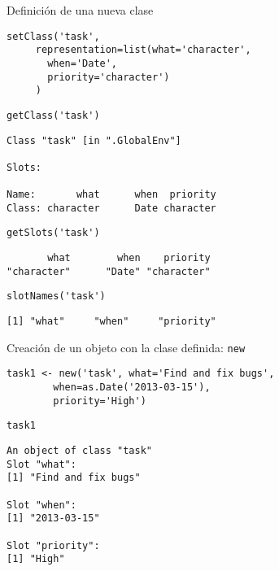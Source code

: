 \documentclass[xcolor={usenames,svgnames,dvipsnames}]{beamer}
\begin{document}
\begin{frame}[fragile,label=sec-3-1-2]{Definición de una nueva clase}
 \lstset{language=R,numbers=none}
\begin{lstlisting}
setClass('task',
	 representation=list(what='character',
	   when='Date',
	   priority='character')
	 )
\end{lstlisting}

\lstset{language=R,numbers=none}
\begin{lstlisting}
getClass('task')
\end{lstlisting}

\begin{verbatim}
Class "task" [in ".GlobalEnv"]

Slots:
                                    
Name:       what      when  priority
Class: character      Date character
\end{verbatim}

\lstset{language=R,numbers=none}
\begin{lstlisting}
getSlots('task')
\end{lstlisting}

\begin{verbatim}
       what        when    priority 
"character"      "Date" "character"
\end{verbatim}

\lstset{language=R,numbers=none}
\begin{lstlisting}
slotNames('task')
\end{lstlisting}

\begin{verbatim}
[1] "what"     "when"     "priority"
\end{verbatim}
\end{frame}
\begin{frame}[fragile,label=sec-3-1-3]{Creación de un objeto con la clase definida: \texttt{new}}
 \lstset{language=R,numbers=none}
\begin{lstlisting}
task1 <- new('task', what='Find and fix bugs',
		when=as.Date('2013-03-15'),
		priority='High')
\end{lstlisting}

\lstset{language=R,numbers=none}
\begin{lstlisting}
task1
\end{lstlisting}

\begin{verbatim}
An object of class "task"
Slot "what":
[1] "Find and fix bugs"

Slot "when":
[1] "2013-03-15"

Slot "priority":
[1] "High"
\end{verbatim}
\end{frame}
\end{document}
